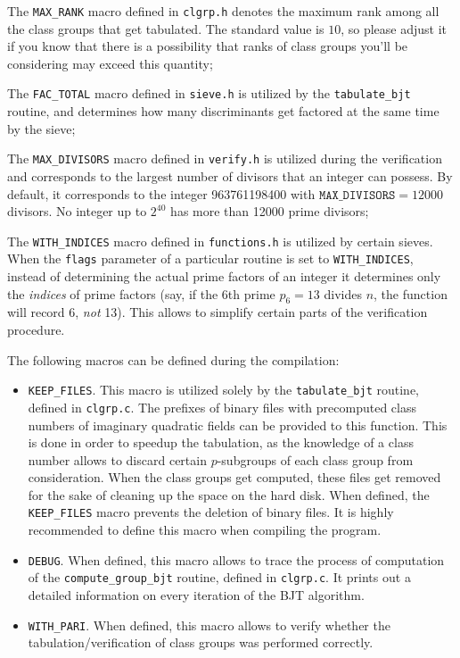 \documentclass[a4paper,10pt]{article}
\newcommand{\code}{\lstinline}
\begin{document}
The \code{MAX_RANK} macro defined in \code{clgrp.h} denotes the maximum rank among all the class groups that get tabulated. The standard value is $10$, so please adjust it if you know that there is a possibility that ranks of class groups you'll be considering may exceed this quantity;

The \code{FAC_TOTAL} macro defined in \code{sieve.h} is utilized by the \code{tabulate_bjt} routine, and determines how many discriminants get factored at the same time by the sieve;

The \code{MAX_DIVISORS} macro defined in \code{verify.h} is utilized during the verification and corresponds to the largest number of divisors that an integer can possess. By default, it corresponds to the integer 963761198400 with $\texttt{MAX\_DIVISORS}=12000$ divisors. No integer up to $2^{40}$ has more than 12000 prime divisors;

The \code{WITH_INDICES} macro defined in \code{functions.h} is utilized by certain sieves. When the \code{flags} parameter of a particular routine is set to \code{WITH_INDICES}, instead of determining the actual prime factors of an integer it determines only the \emph{indices} of prime factors (say, if the 6th prime $p_6 = 13$ divides $n$, the function will record 6, \emph{not} 13). This allows to simplify certain parts of the verification procedure.

The following macros can be defined during the compilation:

\begin{itemize}
\item \code{KEEP_FILES}. This macro is utilized solely by the \code{tabulate_bjt} routine, defined in \code{clgrp.c}. The prefixes of binary files with precomputed class numbers of imaginary quadratic fields can be provided to this function. This is done in order to speedup the tabulation, as the knowledge of a class number allows to discard certain $p$-subgroups of each class group from consideration. When the class groups get computed, these files get removed for the sake of cleaning up the space on the hard disk. When defined, the \code{KEEP_FILES} macro prevents the deletion of binary files. It is highly recommended to define this macro when compiling the program.

\item \code{DEBUG}. When defined, this macro allows to trace the process of computation of the \code{compute_group_bjt} routine, defined in \code{clgrp.c}. It prints out a detailed information on every iteration of the BJT algorithm.

\item \code{WITH_PARI}. When defined, this macro allows to verify whether the tabulation/verification of class groups was performed correctly.
\end{itemize}
\end{document}
